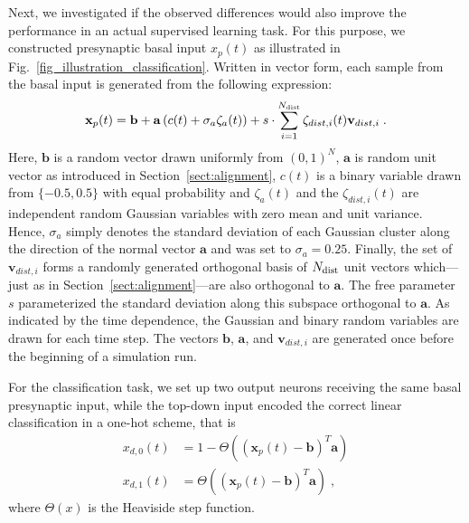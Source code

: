 \documentclass[utf8]{frontiersSCNS} %
\begin{document}
Next, we investigated if the observed differences would also improve
the performance in an actual supervised learning task.
For this purpose, we constructed presynaptic basal 
input $x_p(t)$ as illustrated in 
Fig.~\ref{fig_illustration_classification}.
Written in vector form, each sample from the basal 
input is generated from the following expression:
\begin{equation}
\mathbf{x}_p(t) = \mathbf{b} + \mathbf{a}\left(c(t) + \sigma_a \zeta_a(t) \right) 
+ s \cdot \sum_{i=1}^{N_{\rm dist}} \zeta_{dist,i}(t) \mathbf{v}_{dist,i} \; .
\end{equation}
Here, $\mathbf{b}$ is a random vector drawn uniformly from
$(0,1)^N$, $\mathbf{a}$ is random unit vector as introduced in 
Section~\ref{sect:alignment}, $c(t)$ is a binary variable drawn 
from $\{-0.5,0.5\}$ with equal probability and $\zeta_a(t)$ and the
$\zeta_{dist,i}(t)$ are independent random Gaussian variables with 
zero mean and unit variance. 
Hence, $\sigma_a$ simply denotes the standard deviation of each Gaussian
cluster along the direction of the normal vector $\mathbf{a}$ and was
set to $\sigma_a = 0.25$. 
Finally, the set of $\mathbf{v}_{dist,i}$ forms a randomly generated
orthogonal basis of $N_{\rm dist}$ unit vectors which---just as in 
Section~\ref{sect:alignment}---are also orthogonal to $\mathbf{a}$.
The free parameter $s$ parameterized
the standard deviation along this subspace orthogonal to $\mathbf{a}$.
As indicated by the time dependence, the Gaussian and binary random
variables are drawn for each time step. The vectors
$\mathbf{b}$, $\mathbf{a}$, and $\mathbf{v}_{dist,i}$ are generated
once before the beginning of a simulation run.

For the classification task, we set up two output neurons receiving
the same basal presynaptic input, while the top-down input encoded
the correct linear classification in a one-hot scheme, that is
\begin{align}
x_{d,0}(t) &= 1 - \Theta\left( \left(\mathbf{x}_p(t) - 
\mathbf{b}\right)^T \mathbf{a}\right) \\
x_{d,1}(t) &= \Theta\left( \left(\mathbf{x}_p(t) - 
\mathbf{b}\right)^T \mathbf{a}\right) \; ,
\end{align}
where $\Theta(x)$ is the Heaviside step function.
\end{document}
